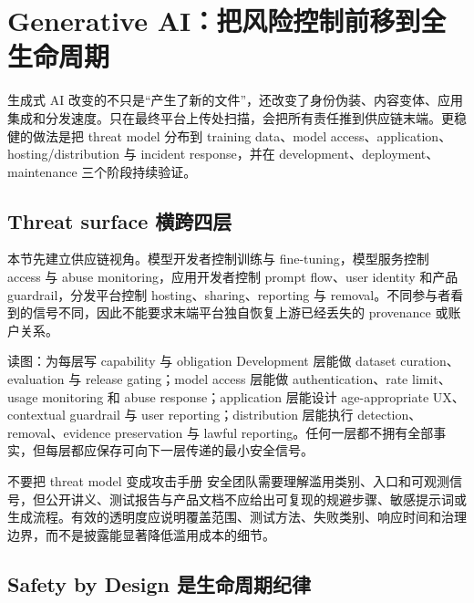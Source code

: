 \section{Generative AI：把风险控制前移到全生命周期}

生成式 AI 改变的不只是“产生了新的文件”，还改变了身份伪装、内容变体、应用集成和分发速度。只在最终平台上传处扫描，会把所有责任推到供应链末端。更稳健的做法是把 threat model 分布到 training data、model access、application、hosting/distribution 与 incident response，并在 development、deployment、maintenance 三个阶段持续验证。

\subsection{Threat surface 横跨四层}

本节先建立供应链视角。模型开发者控制训练与 fine-tuning，模型服务控制 access 与 abuse monitoring，应用开发者控制 prompt flow、user identity 和产品 guardrail，分发平台控制 hosting、sharing、reporting 与 removal。不同参与者看到的信号不同，因此不能要求末端平台独自恢复上游已经丢失的 provenance 或账户关系。


\begin{knowledgebox}{读图：为每层写 capability 与 obligation}
Development 层能做 dataset curation、evaluation 与 release gating；model access 层能做 authentication、rate limit、usage monitoring 和 abuse response；application 层能设计 age-appropriate UX、contextual guardrail 与 user reporting；distribution 层能执行 detection、removal、evidence preservation 与 lawful reporting。任何一层都不拥有全部事实，但每层都应保存可向下一层传递的最小安全信号。
\end{knowledgebox}

\begin{warningbox}{不要把 threat model 变成攻击手册}
安全团队需要理解滥用类别、入口和可观测信号，但公开讲义、测试报告与产品文档不应给出可复现的规避步骤、敏感提示词或生成流程。有效的透明度应说明覆盖范围、测试方法、失败类别、响应时间和治理边界，而不是披露能显著降低滥用成本的细节。
\end{warningbox}

\subsection{Safety by Design 是生命周期纪律}

